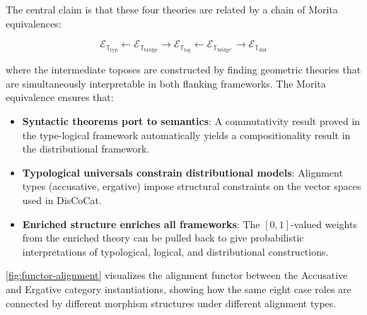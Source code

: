 \documentclass[
]{article}
\providecommand{\tightlist}{%
  \setlength{\itemsep}{0pt}\setlength{\parskip}{0pt}}
\numberwithin{equation}{section}
\begin{document}
The central claim is that these four theories are related by a chain of
Morita equivalences:

\[\mathcal{E}_{\mathbb{T}_{\text{typ}}} \leftarrow \mathcal{E}_{\mathbb{T}_{\text{bridge}}} \rightarrow \mathcal{E}_{\mathbb{T}_{\text{log}}} \leftarrow \mathcal{E}_{\mathbb{T}_{\text{bridge}'}} \rightarrow \mathcal{E}_{\mathbb{T}_{\text{dist}}} \tag{6.1}\]

where the intermediate toposes are constructed by finding geometric
theories that are simultaneously interpretable in both flanking
frameworks. The Morita equivalence ensures that:

\begin{itemize}
\tightlist
\item
  \textbf{Syntactic theorems port to semantics}: A commutativity result
  proved in the type-logical framework automatically yields a
  compositionality result in the distributional framework.
\item
  \textbf{Typological universals constrain distributional models}:
  Alignment types (accusative, ergative) impose structural constraints
  on the vector spaces used in DisCoCat.
\item
  \textbf{Enriched structure enriches all frameworks}: The
  \([0,1]\)-valued weights from the enriched theory can be pulled back
  to give probabilistic interpretations of typological, logical, and
  distributional constructions.
\end{itemize}

\autoref{fig:functor-alignment} visualizes the alignment functor between
the Accusative and Ergative category instantiations, showing how the
same eight case roles are connected by different morphism structures
under different alignment types.
\end{document}
